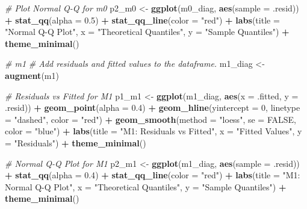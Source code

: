 \documentclass[
]{article}
\newenvironment{Shaded}{\begin{snugshade}}{\end{snugshade}}
\newcommand{\AttributeTok}[1]{\textcolor[rgb]{0.13,0.29,0.53}{#1}}
\newcommand{\CommentTok}[1]{\textcolor[rgb]{0.56,0.35,0.01}{\textit{#1}}}
\newcommand{\ConstantTok}[1]{\textcolor[rgb]{0.56,0.35,0.01}{#1}}
\newcommand{\DecValTok}[1]{\textcolor[rgb]{0.00,0.00,0.81}{#1}}
\newcommand{\FloatTok}[1]{\textcolor[rgb]{0.00,0.00,0.81}{#1}}
\newcommand{\FunctionTok}[1]{\textcolor[rgb]{0.13,0.29,0.53}{\textbf{#1}}}
\newcommand{\NormalTok}[1]{#1}
\newcommand{\OtherTok}[1]{\textcolor[rgb]{0.56,0.35,0.01}{#1}}
\newcommand{\SpecialCharTok}[1]{\textcolor[rgb]{0.81,0.36,0.00}{\textbf{#1}}}
\newcommand{\StringTok}[1]{\textcolor[rgb]{0.31,0.60,0.02}{#1}}
\begin{document}
\begin{Shaded}
\begin{Highlighting}[]
\CommentTok{\# Plot Normal Q{-}Q for m0}
\NormalTok{p2\_m0 }\OtherTok{\textless{}{-}} \FunctionTok{ggplot}\NormalTok{(m0\_diag, }\FunctionTok{aes}\NormalTok{(}\AttributeTok{sample =}\NormalTok{ .resid)) }\SpecialCharTok{+}
  \FunctionTok{stat\_qq}\NormalTok{(}\AttributeTok{alpha =} \FloatTok{0.5}\NormalTok{) }\SpecialCharTok{+}
  \FunctionTok{stat\_qq\_line}\NormalTok{(}\AttributeTok{color =} \StringTok{"red"}\NormalTok{) }\SpecialCharTok{+}
  \FunctionTok{labs}\NormalTok{(}\AttributeTok{title =} \StringTok{"Normal Q{-}Q Plot"}\NormalTok{,}
       \AttributeTok{x =} \StringTok{"Theoretical Quantiles"}\NormalTok{,}
       \AttributeTok{y =} \StringTok{"Sample Quantiles"}\NormalTok{) }\SpecialCharTok{+}
  \FunctionTok{theme\_minimal}\NormalTok{()}

\CommentTok{\# m1 }
\CommentTok{\# Add residuals and fitted values to the dataframe.}
\NormalTok{m1\_diag }\OtherTok{\textless{}{-}} \FunctionTok{augment}\NormalTok{(m1)}

\CommentTok{\# Residuals vs Fitted for M1}
\NormalTok{p1\_m1 }\OtherTok{\textless{}{-}} \FunctionTok{ggplot}\NormalTok{(m1\_diag, }\FunctionTok{aes}\NormalTok{(}\AttributeTok{x =}\NormalTok{ .fitted, }\AttributeTok{y =}\NormalTok{ .resid)) }\SpecialCharTok{+}
  \FunctionTok{geom\_point}\NormalTok{(}\AttributeTok{alpha =} \FloatTok{0.4}\NormalTok{) }\SpecialCharTok{+}
  \FunctionTok{geom\_hline}\NormalTok{(}\AttributeTok{yintercept =} \DecValTok{0}\NormalTok{, }\AttributeTok{linetype =} \StringTok{"dashed"}\NormalTok{, }\AttributeTok{color =} \StringTok{"red"}\NormalTok{) }\SpecialCharTok{+}
  \FunctionTok{geom\_smooth}\NormalTok{(}\AttributeTok{method =} \StringTok{"loess"}\NormalTok{, }\AttributeTok{se =} \ConstantTok{FALSE}\NormalTok{, }\AttributeTok{color =} \StringTok{"blue"}\NormalTok{) }\SpecialCharTok{+}
  \FunctionTok{labs}\NormalTok{(}\AttributeTok{title =} \StringTok{"M1: Residuals vs Fitted"}\NormalTok{,}
       \AttributeTok{x =} \StringTok{"Fitted Values"}\NormalTok{,}
       \AttributeTok{y =} \StringTok{"Residuals"}\NormalTok{) }\SpecialCharTok{+}
  \FunctionTok{theme\_minimal}\NormalTok{()}

\CommentTok{\# Normal Q{-}Q Plot for M1}
\NormalTok{p2\_m1 }\OtherTok{\textless{}{-}} \FunctionTok{ggplot}\NormalTok{(m1\_diag, }\FunctionTok{aes}\NormalTok{(}\AttributeTok{sample =}\NormalTok{ .resid)) }\SpecialCharTok{+}
  \FunctionTok{stat\_qq}\NormalTok{(}\AttributeTok{alpha =} \FloatTok{0.4}\NormalTok{) }\SpecialCharTok{+}
  \FunctionTok{stat\_qq\_line}\NormalTok{(}\AttributeTok{color =} \StringTok{"red"}\NormalTok{) }\SpecialCharTok{+}
  \FunctionTok{labs}\NormalTok{(}\AttributeTok{title =} \StringTok{"M1: Normal Q{-}Q Plot"}\NormalTok{,}
       \AttributeTok{x =} \StringTok{"Theoretical Quantiles"}\NormalTok{,}
       \AttributeTok{y =} \StringTok{"Sample Quantiles"}\NormalTok{) }\SpecialCharTok{+}
  \FunctionTok{theme\_minimal}\NormalTok{()}



\end{Highlighting}
\end{Shaded}
\end{document}
